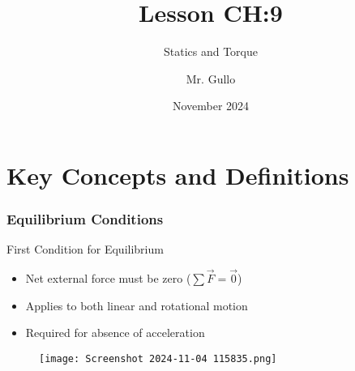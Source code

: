 \documentclass{beamer}
\title{Lesson CH:9}
\subtitle{Statics and Torque}
\author{Mr. Gullo}
\date{November 2024}
\begin{document}
\frame{\titlepage}

\section{Key Concepts and Definitions}
\begin{frame}
\frametitle{Equilibrium Conditions}

\begin{block}{First Condition for Equilibrium}
\begin{itemize}
    \item Net external force must be zero ($\sum \vec{F} = \vec{0}$)
    \item Applies to both linear and rotational motion
    \item Required for absence of acceleration
\end{itemize}
\end{block}

\begin{figure}
    \centering
    \texttt{[image: Screenshot 2024-11-04 115835.png]}
\end{figure}
\end{frame}
\end{document}
